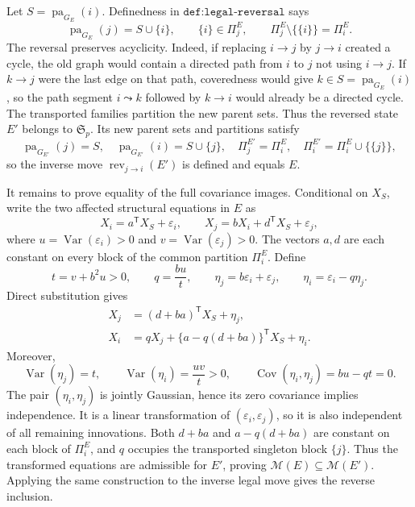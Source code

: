 Let \(S=\operatorname{pa}_{G_E}(i)\). Definedness in \(\texttt{def:legal-reversal}\) says
\[
 \operatorname{pa}_{G_E}(j)=S\cup\{i\},
 \qquad \{i\}\in\Pi^E_j,
 \qquad \Pi^E_j\setminus\{\{i\}\}=\Pi^E_i.
\]
The reversal preserves acyclicity. Indeed, if replacing \(i\to j\) by \(j\to i\) created a cycle, the old graph would contain a directed path from \(i\) to \(j\) not using \(i\to j\). If \(k\to j\) were the last edge on that path, coveredness would give \(k\in S=\operatorname{pa}_{G_E}(i)\), so the path segment \(i\leadsto k\) followed by \(k\to i\) would already be a directed cycle. The transported families partition the new parent sets. Thus the reversed state \(E'\) belongs to \(\mathfrak S_p\). Its new parent sets and partitions satisfy
\[
 \operatorname{pa}_{G_{E'}}(j)=S,
 \quad \operatorname{pa}_{G_{E'}}(i)=S\cup\{j\},
 \quad \Pi^{E'}_j=\Pi^E_i,
 \quad \Pi^{E'}_i=\Pi^E_i\cup\{\{j\}\},
\]
so the inverse move \(\operatorname{rev}_{j\to i}(E')\) is defined and equals \(E\).

It remains to prove equality of the full covariance images. Conditional on \(X_S\), write the two affected structural equations in \(E\) as
\[
 X_i=a^{\mathsf T}X_S+\varepsilon_i,
 \qquad
 X_j=bX_i+d^{\mathsf T}X_S+\varepsilon_j,
\]
where \(u=\operatorname{Var}(\varepsilon_i)>0\) and \(v=\operatorname{Var}(\varepsilon_j)>0\). The vectors \(a,d\) are each constant on every block of the common partition \(\Pi^E_i\). Define
\[
 t=v+b^2u>0,
 \qquad q=\frac{bu}{t},
 \qquad \eta_j=b\varepsilon_i+\varepsilon_j,
 \qquad \eta_i=\varepsilon_i-q\eta_j.
\]
Direct substitution gives
\[
 \begin{aligned}
 X_j&=(d+ba)^{\mathsf T}X_S+\eta_j,\\
 X_i&=qX_j+\{a-q(d+ba)\}^{\mathsf T}X_S+\eta_i.
 \end{aligned}
\]
Moreover,
\[
 \operatorname{Var}(\eta_j)=t,
 \qquad
 \operatorname{Var}(\eta_i)=\frac{uv}{t}>0,
 \qquad
 \operatorname{Cov}(\eta_i,\eta_j)=bu-qt=0.
\]
The pair \((\eta_i,\eta_j)\) is jointly Gaussian, hence its zero covariance implies independence. It is a linear transformation of \((\varepsilon_i,\varepsilon_j)\), so it is also independent of all remaining innovations. Both \(d+ba\) and \(a-q(d+ba)\) are constant on each block of \(\Pi^E_i\), and \(q\) occupies the transported singleton block \(\{j\}\). Thus the transformed equations are admissible for \(E'\), proving \(\mathcal M(E)\subseteq\mathcal M(E')\). Applying the same construction to the inverse legal move gives the reverse inclusion.


